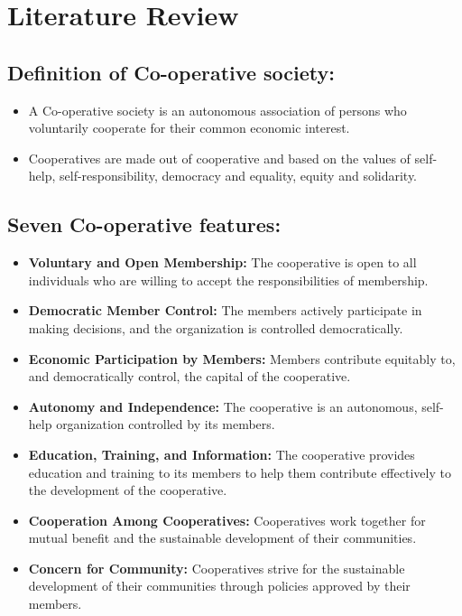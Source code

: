 
\chapter{Literature Review}
\label{chap:2}

\section{Definition of Co-operative society: }
\begin{itemize}
    \item A Co-operative society is an autonomous association of persons who voluntarily cooperate for their 
    common economic interest.    
    
    \item Cooperatives are made out of cooperative and based on the values of self-help, self-responsibility, 
    democracy and equality, equity and solidarity.
\end{itemize}

\section{Seven Co-operative features:}
\begin{itemize}
    \item \textbf{Voluntary and Open Membership:} The cooperative is open to all individuals who are willing to accept the responsibilities of membership.
    
    \item \textbf{Democratic Member Control:} The members actively participate in making decisions, and the organization is controlled democratically.
    
    \item \textbf{Economic Participation by Members:} Members contribute equitably to, and democratically control, the capital of the cooperative.
    
    \item \textbf{Autonomy and Independence:} The cooperative is an autonomous, self-help organization controlled by its members.
    
    \item \textbf{Education, Training, and Information:} The cooperative provides education and training to its members to help them contribute effectively to the development of the cooperative.
    
    \item \textbf{Cooperation Among Cooperatives:} Cooperatives work together for mutual benefit and the sustainable development of their communities.
    
    \item \textbf{Concern for Community:} Cooperatives strive for the sustainable development of their communities through policies approved by their members.
\end{itemize}

